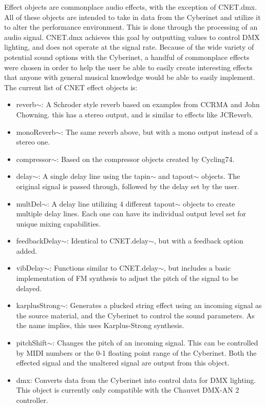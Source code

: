 Effect objects are commonplace audio effects, with the exception of CNET.dmx. All of these objects are intended to take in data from the Cyberinet and utilize it to alter the performance environment. This is done through the processing of an audio signal. CNET.dmx achieves this goal by outputting values to control DMX lighting, and does not operate at the signal rate. Because of the wide variety of potential sound options with the Cyberinet, a handful of commonplace effects were chosen in order to help the user be able to easily create interesting effects that anyone with general musical knowledge would be able to easily implement. The current list of CNET effect objects is:

\begin{itemize}
    \item reverb$\sim$: A Schroder style reverb based on examples from CCRMA and John Chowning. this has a stereo output, and is similar to effects like JCReverb.
    \item monoReverb$\sim$: The same reverb above, but with a mono output instead of a stereo one.
    \item compressor$\sim$: Based on the compressor objects created by Cycling74.
    \item delay$\sim$: A single delay line using the tapin$\sim$ and tapout$\sim$ objects. The original signal is passed through, followed by the delay set by the user.
    \item multDel$\sim$: A delay line utilizing 4 different tapout$\sim$ objects to create multiple delay lines. Each one can have its individual output level set for unique mixing capabilities.
    \item feedbackDelay$\sim$: Identical to CNET.delay$\sim$, but with a feedback option added.
    \item vibDelay$\sim$: Functions similar to CNET.delay$\sim$, but includes a basic implementation of FM synthesis to adjust the pitch of the signal to be delayed. 
    \item karplusStrong$\sim$: Generates a plucked string effect using an incoming signal as the source material, and the Cyberinet to control the sound parameters. As the name implies, this uses Karplus-Strong synthesis.
    \item pitchShift$\sim$: Changes the pitch of an incoming signal. This can be controlled by MIDI  numbers or the 0-1 floating point range of the Cyberinet. Both the effected signal and the unaltered signal are output from this object.
    \item dmx: Converts data from the Cyberinet into control data for DMX lighting. This object is currently only compatible with the Chauvet DMX-AN 2 controller.
\end{itemize}

